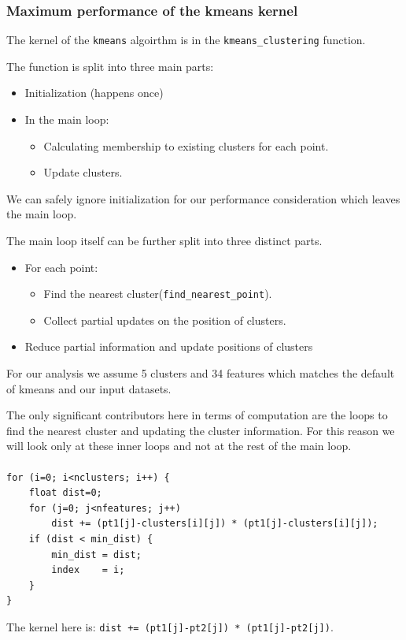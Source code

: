 \subsubsection{Maximum performance of the kmeans kernel}

The kernel of the \texttt{kmeans} algoirthm is in the \texttt{kmeans\_clustering} function.

The function is split into three main parts:
\begin{itemize}
	\item Initialization (happens once)
	\item In the main loop:
	\begin{itemize}
		\item Calculating membership to existing clusters for each point.
		\item Update clusters.
	\end{itemize}
\end{itemize}

We can safely ignore initialization for our performance consideration which leaves the main loop.

The main loop itself can be further split into three distinct parts.
\begin{itemize}
	\item For each point:
	\begin{itemize}
		\item Find the nearest cluster(\texttt{find\_nearest\_point}).
		\item Collect partial updates on the position of clusters.
	\end{itemize}
	\item Reduce partial information and update positions of clusters 	
\end{itemize}

For our analysis we assume 5 clusters and 34 features which matches
the default of kmeans and our input datasets.

The only significant contributors here in terms of computation are the loops to find the nearest cluster and updating the cluster information.
For this reason we will look only at these inner loops and not at the rest of the main loop.

\paragraph{}
\begin{lstlisting}[caption={Inlined representation of find\_nearest\_point}]
for (i=0; i<nclusters; i++) {
	float dist=0;
	for (j=0; j<nfeatures; j++)
		dist += (pt1[j]-clusters[i][j]) * (pt1[j]-clusters[i][j]);
	if (dist < min_dist) {
		min_dist = dist;
		index    = i;
	}
}
\end{lstlisting}
The kernel here is:
\texttt{dist += (pt1[j]-pt2[j]) * (pt1[j]-pt2[j])}.\newline

